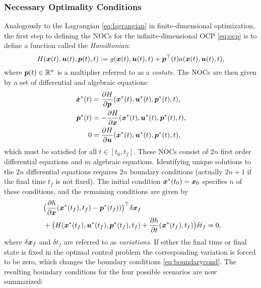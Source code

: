 \subsubsection{Necessary Optimality Conditions}
Analogously to the Lagrangian \eqref{eq:lagrangian} in finite-dimensional optimization, the first step to defining the NOCs for the infinite-dimensional OCP \eqref{eq:ocp} is to define a function called the \textit{Hamiltonian}:
\begin{equation} \label{eq:hamiltonian}
H(\bm{x}(t), \bm{u}(t), \bm{p}(t), t) := g(\bm{x}(t), \bm{u}(t), t) + \bm{p}^\top (t)a(\bm{x}(t), \bm{u}(t), t),
\end{equation}
where $\bm{p}(t) \in \mathbb{R}^n$ is a multiplier referred to as a \textit{costate}. The NOCs are then given by a set of differential and algebraic equations:
\begin{equation} \label{eq:optnoc}
\begin{split}
\dot{\bm{x}}^*(t) &= \frac{\partial{H}}{\partial{\bm{p}}}(\bm{x}^*(t), \bm{u}^*(t), \bm{p}^*(t), t), \\
\dot{\bm{p}}^*(t) &= -\frac{\partial{H}}{\partial{\bm{x}}}(\bm{x}^*(t), \bm{u}^*(t), \bm{p}^*(t), t), \\
0 &= \frac{\partial{H}}{\partial{\bm{u}}}(\bm{x}^*(t), \bm{u}^*(t), \bm{p}^*(t), t),
\end{split}
\end{equation}
which must be satisfied for all $t \in [t_0, t_f]$. These NOCs consist of $2n$ first order differential equations and $m$ algebraic equations. Identifying unique solutions to the $2n$ differential equations requires $2n$ boundary conditions (actually $2n+1$ if the final time $t_f$ is not fixed). The initial condition $\bm{x}^*(t_0) = \bm{x}_0$ specifies $n$ of these conditions, and the remaining conditions are given by
\begin{equation} \label{eq:boundarycond}
\begin{split}
&\big(\frac{\partial{h}}{\partial{\bm{x}}}(\bm{x}^*(t_f), t_f) - \bm{p}^*(t_f))\big)^\top \delta{\bm{x}_f}\\\
& + \big(H(\bm{x}^*(t_f), \bm{u}^*(t_f), \bm{p}^*(t_f), t_f) +\frac{\partial{h}}{\partial{t}}(\bm{x}^*(t_f), t_f)\big)\delta t_f = 0,\\
\end{split}
\end{equation}
where $\delta \bm{x}_f$ and $\delta t_f$ are referred to as \textit{variations}. If either the final time or final state is fixed in the optimal control problem the corresponding variation is forced to be zero, which changes the boundary conditions \eqref{eq:boundarycond}. The resulting boundary conditions for the four possible scenarios are now summarized:


